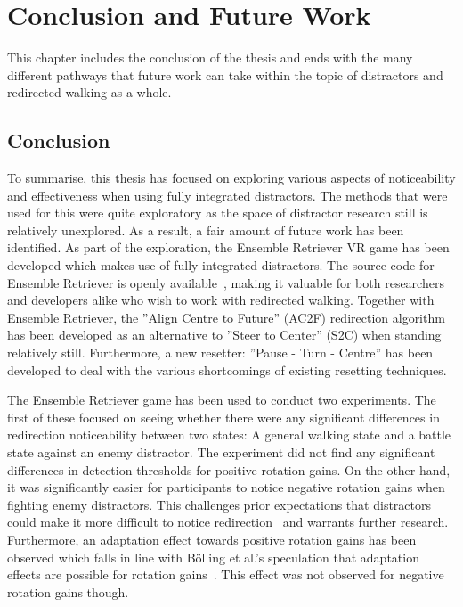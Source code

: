 \chapter{Conclusion and Future Work}\label{chap:conclusion}
This chapter includes the conclusion of the thesis and ends with the many different pathways that future work can take within the topic of distractors and redirected walking as a whole. 

\section{Conclusion}
To summarise, this thesis has focused on exploring various aspects of noticeability and effectiveness when using fully integrated distractors. The methods that were used for this were quite exploratory as the space of distractor research still is relatively unexplored. As a result, a fair amount of future work has been identified. As part of the exploration, the Ensemble Retriever VR game has been developed which makes use of fully integrated distractors. The source code for Ensemble Retriever is openly available~\cite{projectRepository}, making it valuable for both researchers and developers alike who wish to work with redirected walking. Together with Ensemble Retriever, the ''Align Centre to Future'' (AC2F) redirection algorithm has been developed as an alternative to ''Steer to Center'' (S2C) when standing relatively still. Furthermore, a new resetter: ''Pause - Turn - Centre'' has been developed to deal with the various shortcomings of existing resetting techniques. 

The Ensemble Retriever game has been used to conduct two experiments. The first of these focused on seeing whether there were any significant differences in redirection noticeability between two states: A general walking state and a battle state against an enemy distractor. The experiment did not find any significant differences in detection thresholds for positive rotation gains. On the other hand, it was significantly easier for participants to notice negative rotation gains when fighting enemy distractors. This challenges prior expectations that distractors could make it more difficult to notice redirection~\cite{5072212, schmitz2018you, sra2018vmotion} and warrants further research. Furthermore, an adaptation effect towards positive rotation gains has been observed which falls in line with B{\"o}lling et al.'s speculation that adaptation effects are possible for rotation gains~\cite{bolling2019shrinking}. This effect was not observed for negative rotation gains though. 

